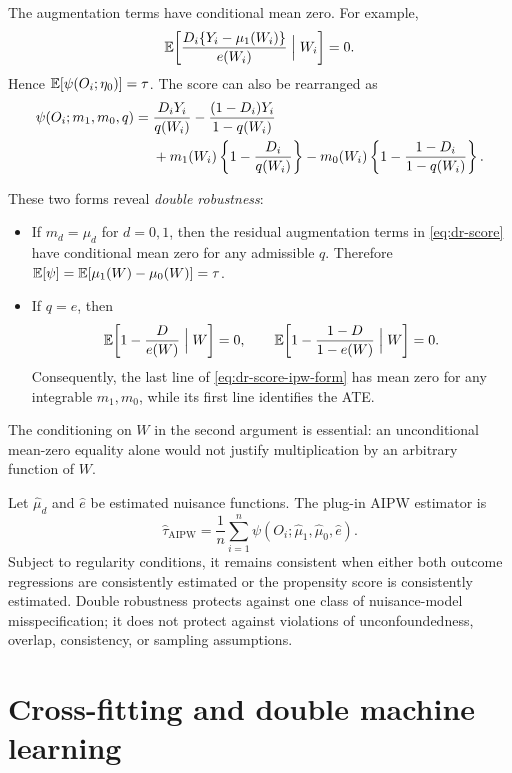 The augmentation terms have conditional mean zero.  For example,
\[
  \mathbb{E}\!\left[
    \frac{D_i\{Y_i-\mu_1(W_i)\}}{e(W_i)}\Bigm|W_i
  \right]=0.
\]
Hence $\mathbb{E}[\psi(O_i;\eta_0)]=\tau$.  The score can also be rearranged as
\begin{align}
  \psi(O_i;m_1,m_0,q)
  ={}&\frac{D_iY_i}{q(W_i)}
      -\frac{(1-D_i)Y_i}{1-q(W_i)} \notag\\
    &+m_1(W_i)\left\{1-\frac{D_i}{q(W_i)}\right\}
      -m_0(W_i)\left\{1-\frac{1-D_i}{1-q(W_i)}\right\}.
  \label{eq:dr-score-ipw-form}
\end{align}

These two forms reveal \emph{double robustness}:

\begin{itemize}
  \item If $m_d=\mu_d$ for $d=0,1$, then the residual augmentation terms in
  \eqref{eq:dr-score} have conditional mean zero for any admissible $q$.
  Therefore $\mathbb{E}[\psi]=\mathbb{E}[\mu_1(W)-\mu_0(W)]=\tau$.
  \item If $q=e$, then
  \[
    \mathbb{E}\!\left[1-\frac{D}{e(W)}\Bigm|W\right]=0,
    \qquad
    \mathbb{E}\!\left[1-\frac{1-D}{1-e(W)}\Bigm|W\right]=0.
  \]
  Consequently, the last line of \eqref{eq:dr-score-ipw-form} has mean zero for
  any integrable $m_1,m_0$, while its first line identifies the ATE.
\end{itemize}

The conditioning on $W$ in the second argument is essential: an unconditional
mean-zero equality alone would not justify multiplication by an arbitrary function
of $W$.

Let $\widehat\mu_d$ and $\widehat e$ be estimated nuisance functions.  The plug-in
AIPW estimator is
\begin{equation}
  \widehat\tau_{\mathrm{AIPW}}
  =\frac1n\sum_{i=1}^n
  \psi(O_i;\widehat\mu_1,\widehat\mu_0,\widehat e).
  \label{eq:dr-feasible-aipw}
\end{equation}
Subject to regularity conditions, it remains consistent when either both outcome
regressions are consistently estimated or the propensity score is consistently
estimated.  Double robustness protects against one class of nuisance-model
misspecification; it does not protect against violations of unconfoundedness,
overlap, consistency, or sampling assumptions.

\section{Cross-fitting and double machine learning}
\label{sec:dr-dml}

